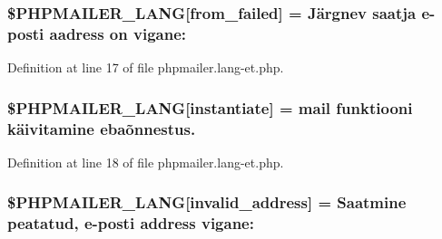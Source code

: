 \subsubsection[{\texorpdfstring{\$\+P\+H\+P\+M\+A\+I\+L\+E\+R\+\_\+\+L\+A\+NG}{$PHPMAILER_LANG}}]{\setlength{\rightskip}{0pt plus 5cm}\$P\+H\+P\+M\+A\+I\+L\+E\+R\+\_\+\+L\+A\+NG\mbox{[}\textquotesingle{}from\+\_\+failed\textquotesingle{}\mbox{]} = \textquotesingle{}Järgnev saatja {\bf e}-\/posti aadress {\bf on} vigane\+: \textquotesingle{}}\hypertarget{phpmailer_8lang-et_8php_adf832ae12155a09be077c6d5e4fd7e22}{}\label{phpmailer_8lang-et_8php_adf832ae12155a09be077c6d5e4fd7e22}


Definition at line 17 of file phpmailer.\+lang-\/et.\+php.

\subsubsection[{\texorpdfstring{\$\+P\+H\+P\+M\+A\+I\+L\+E\+R\+\_\+\+L\+A\+NG}{$PHPMAILER_LANG}}]{\setlength{\rightskip}{0pt plus 5cm}\$P\+H\+P\+M\+A\+I\+L\+E\+R\+\_\+\+L\+A\+NG\mbox{[}\textquotesingle{}instantiate\textquotesingle{}\mbox{]} = \textquotesingle{}mail funktiooni käivitamine ebaõnnestus.\textquotesingle{}}\hypertarget{phpmailer_8lang-et_8php_ad58dde16780f4770ccf4dd282ea1f5ad}{}\label{phpmailer_8lang-et_8php_ad58dde16780f4770ccf4dd282ea1f5ad}


Definition at line 18 of file phpmailer.\+lang-\/et.\+php.

\subsubsection[{\texorpdfstring{\$\+P\+H\+P\+M\+A\+I\+L\+E\+R\+\_\+\+L\+A\+NG}{$PHPMAILER_LANG}}]{\setlength{\rightskip}{0pt plus 5cm}\$P\+H\+P\+M\+A\+I\+L\+E\+R\+\_\+\+L\+A\+NG\mbox{[}\textquotesingle{}invalid\+\_\+address\textquotesingle{}\mbox{]} = \textquotesingle{}Saatmine peatatud, {\bf e}-\/posti address vigane\+: \textquotesingle{}}\hypertarget{phpmailer_8lang-et_8php_a42d61bcea4c79599ecb44fd062f54d47}{}\label{phpmailer_8lang-et_8php_a42d61bcea4c79599ecb44fd062f54d47}


